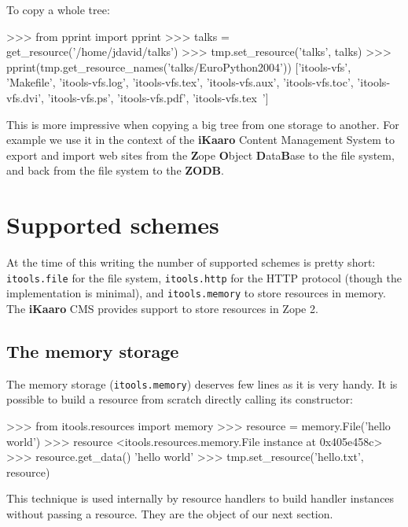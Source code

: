 To copy a whole tree:

\begin{code}
    >>> from pprint import pprint
    >>> talks = get_resource('/home/jdavid/talks')
    >>> tmp.set_resource('talks', talks)
    >>> pprint(tmp.get_resource_names('talks/EuroPython2004'))
    ['itools-vfs',
     'Makefile',
     'itools-vfs.log',
     'itools-vfs.tex',
     'itools-vfs.aux',
     'itools-vfs.toc',
     'itools-vfs.dvi',
     'itools-vfs.ps',
     'itools-vfs.pdf',
     'itools-vfs.tex~']
\end{code}

This is more impressive when copying a big tree from one storage to another.
For example we use it in the context of the {\bf iKaaro} Content Management
System to export and import web sites from the {\bf Z}ope {\bf O}bject
{\bf D}ata{\bf B}ase to the file system, and back from the file system to the
{\bf ZODB}.


\section{Supported schemes}

At the time of this writing the number of supported schemes is pretty short:
{\tt itools.file} for the file system, {\tt itools.http} for the HTTP
protocol (though the implementation is minimal), and {\tt itools.memory}
to store resources in memory. The {\bf iKaaro} CMS provides support to
store resources in Zope 2.

\subsection{The memory storage}

The memory storage ({\tt itools.memory}) deserves few lines as it is very
handy. It is possible to build a resource from scratch directly calling its
constructor:

\begin{code}
    >>> from itools.resources import memory
    >>> resource = memory.File('hello world')
    >>> resource
    <itools.resources.memory.File instance at 0x405e458c>
    >>> resource.get_data()
    'hello world'
    >>> tmp.set_resource('hello.txt', resource)
\end{code}

This technique is used internally by resource handlers to build handler
instances without passing a resource. They are the object of our next
section.
